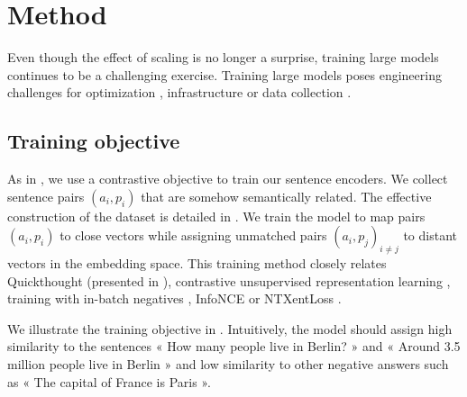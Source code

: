 
\section{Method}

Even though the effect of scaling is no longer a surprise, training large models continues to be a challenging exercise. Training large models poses engineering challenges for optimization \parencite{you_20}, infrastructure \parencite{shoeybi_19, narayanan_21} or data collection \parencite{OrtizSuarezSagotRomary2019}.

\subsection{Training objective}

As in , we use a contrastive objective to train our sentence encoders. We collect sentence pairs $(a_i, p_i)$ that are somehow semantically related. The effective construction of the dataset is detailed in . We train the model to map pairs $(a_i, p_i)$ to close vectors while assigning unmatched pairs $(a_i, p_j)_{i \neq j}$ to distant vectors in the embedding space. This training method closely relates Quickthought (presented in ), contrastive unsupervised representation learning \parencite{saunshi_19}, training with in-batch negatives \parencite{carlsson_21}, InfoNCE \parencite{oord_18} or NTXentLoss \parencite{sohn_16}.

We illustrate the training objective in . Intuitively, the model should assign high similarity to the sentences « How many people live in Berlin? » and « Around 3.5 million people live in Berlin » and low similarity to other negative answers such as « The capital of France is Paris ».

